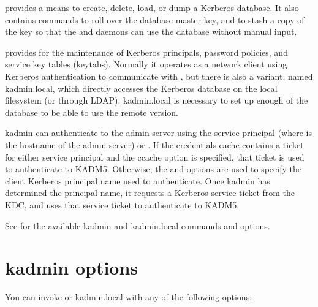 \documentclass[letterpaper,10pt,english]{sphinxmanual}
\begin{document}
{\hyperref[\detokenize{admin/admin_commands/kdb5_util:kdb5-util-8}]{}} provides a means to create, delete, load, or dump
a Kerberos database.  It also contains commands to roll over the
database master key, and to stash a copy of the key so that the
{\hyperref[\detokenize{admin/admin_commands/kadmind:kadmind-8}]{}} and {\hyperref[\detokenize{admin/admin_commands/krb5kdc:krb5kdc-8}]{}} daemons can use the database
without manual input.

{\hyperref[\detokenize{admin/admin_commands/kadmin_local:kadmin-1}]{}} provides for the maintenance of Kerberos principals,
password policies, and service key tables (keytabs).  Normally it
operates as a network client using Kerberos authentication to
communicate with {\hyperref[\detokenize{admin/admin_commands/kadmind:kadmind-8}]{}}, but there is also a variant, named
kadmin.local, which directly accesses the Kerberos database on the
local filesystem (or through LDAP).  kadmin.local is necessary to set
up enough of the database to be able to use the remote version.

kadmin can authenticate to the admin server using the service
principal  (where  is the hostname of the admin
server) or .  If the credentials cache contains a
ticket for either service principal and the  ccache option is
specified, that ticket is used to authenticate to KADM5.  Otherwise,
the  and  options are used to specify the client Kerberos
principal name used to authenticate.  Once kadmin has determined the
principal name, it requests a  Kerberos service ticket
from the KDC, and uses that service ticket to authenticate to KADM5.

See {\hyperref[\detokenize{admin/admin_commands/kadmin_local:kadmin-1}]{}} for the available kadmin and kadmin.local
commands and options.


\section{kadmin options}
\label{\detokenize{admin/database:kadmin-options}}
You can invoke {\hyperref[\detokenize{admin/admin_commands/kadmin_local:kadmin-1}]{}} or kadmin.local with any of the
following options:
\end{document}
